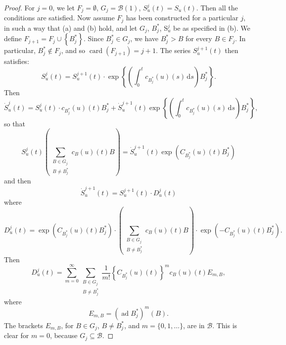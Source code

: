 \documentclass[leqno]{article}
\theoremstyle{plain}
\newcommand{\dd}{\,\mathrm{d}}
\begin{document}
\begin{proof}
	For $j=0$, we let $F_{j}=\emptyset$, $G_{j}=\mathcal{B}(1)$, $S_{u}^{j}(t)=S_{u}(t)$. 
	Then all the conditions are satisfied. 
	Now assume $F_{j}$ has been constructed for a particular $j$, in such a way that (a) and (b) hold, and let $G_{j}$, $B_{j}^{*}$, S$_{u}^{j}$ be as specified in (b). 
	We define $F_{j+1}=F_{j} \cup\left\{B_{j}^{*}\right\}$.
	Since $B_{j}^{*} \in G_{j}$, we have $B_{j}^{*}>B$ for every $B \in F_{j}$.
	In particular, $B_{j}^{*} \notin F_{j}$, and so $\operatorname{card} \left(F_{j+1}\right)=j+1$. 
	The series $S_{u}^{j+1}(t)$ then satisfies:
	\begin{equation}
		S_{u}^{j}(t)=S_{u}^{j+1}(t) \cdot \exp \left\{\left(\int_{0}^{t} c_{B_{j}^*}(u)(s) \dd s\right) B_{j}^{*}\right\}.
	\end{equation}
	Then
	\begin{equation}
		\dot{S}_{u}^{j}(t) = S_{u}^{j}(t) \cdot c_{B_j^*}(u)(t) B_{j}^{*}+\dot{S}_{u}^{j+1}(t) \exp \left\{\left(\int_{0}^{t} c_{B_{j}^*}(u)(s) \dd s\right) B_{j}^{*}\right\},
	\end{equation}
	so that
	\begin{equation}
		S_{u}^{j}(t)\left(\sum_{\substack{B \in G_{j}\\B \neq B_{j}^{*}}} c_{B}(u)(t) B\right)=\dot{S}_{u}^{j+1}(t) \exp \left(C_{B_{j}^{*}}(u)(t) B_{j}^{*}\right)
	\end{equation}
	and then
	\begin{equation}
		\dot{S}_{u}^{j+1}(t)=S_{u}^{j+1}(t) \cdot D_{u}^{j}(t)
	\end{equation}
	where
	\begin{equation}
		D_{u}^{j}(t)=\exp \left(C_{B_{j}^{*}}(u)(t) B_{j}^{*}\right) \cdot\left(\sum_{\substack{B \in G_{j}\\B \neq B_{j}^{*}}} c_{B}(u)(t) B\right) \cdot \exp \left(-C_{B_{j}^{*}}(u)(t) B_{j}^{*}\right).
	\end{equation}
	Then
	\begin{equation} \label{eq:28}
		D^j_u(t) = \sum_{m=0}^\infty \sum_{\substack{B \in G_{j}\\B \neq B_{j}^{*}}} \frac{1}{m!} \left\{ C_{B_j^*}(u)(t)\right\}^m c_B(u)(t) E_{m,B},
	\end{equation}
	where
	\begin{equation}
		E_{m, B}=\left(\operatorname{ad} B_{j}^{*}\right)^{m}(B).
	\end{equation}
	The brackets $E_{m, B}$, for $B \in G_{j}$, $B \neq B_{j}^{*}$, and $m=\{0,1, \ldots\}$, are in $\mathcal{B}$. 
	This is clear for $m=0$, because $G_{j} \subseteq \mathcal{B}$. 

\end{proof}
\end{document}
